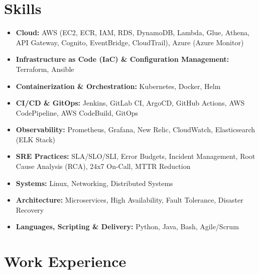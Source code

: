 \documentclass[a4paper,10.999999pt]{article}
\begin{document}
    \section{Skills}
    \begin{itemize}[leftmargin=1.35em, itemsep=0.35pt, topsep=0.3pt, parsep=0pt, label=\raisebox{0.25ex}{\tiny$\circ$}]
    \item \textbf{Cloud:} AWS (EC2, ECR, IAM, RDS, DynamoDB, Lambda, Glue, Athena, API Gateway, Cognito, EventBridge, CloudTrail), Azure (Azure Monitor)
    \item \textbf{Infrastructure as Code (IaC) \& Configuration Management:} Terraform, Ansible
    \item \textbf{Containerization \& Orchestration:} Kubernetes, Docker, Helm
    \item \textbf{CI/CD \& GitOps:} Jenkins, GitLab CI, ArgoCD, GitHub Actions, AWS CodePipeline, AWS CodeBuild, GitOps
    \item \textbf{Observability:} Prometheus, Grafana, New Relic, CloudWatch, Elasticsearch (ELK Stack)
    \item \textbf{SRE Practices:} SLA/SLO/SLI, Error Budgets, Incident Management, Root Cause Analysis (RCA), 24x7 On-Call, MTTR Reduction
    \item \textbf{Systems:} Linux, Networking, Distributed Systems
    \item \textbf{Architecture:} Microservices, High Availability, Fault Tolerance, Disaster Recovery
    \item \textbf{Languages, Scripting \& Delivery:} Python, Java, Bash, Agile/Scrum
    \end{itemize}


    \section{Work Experience}
\end{document}
